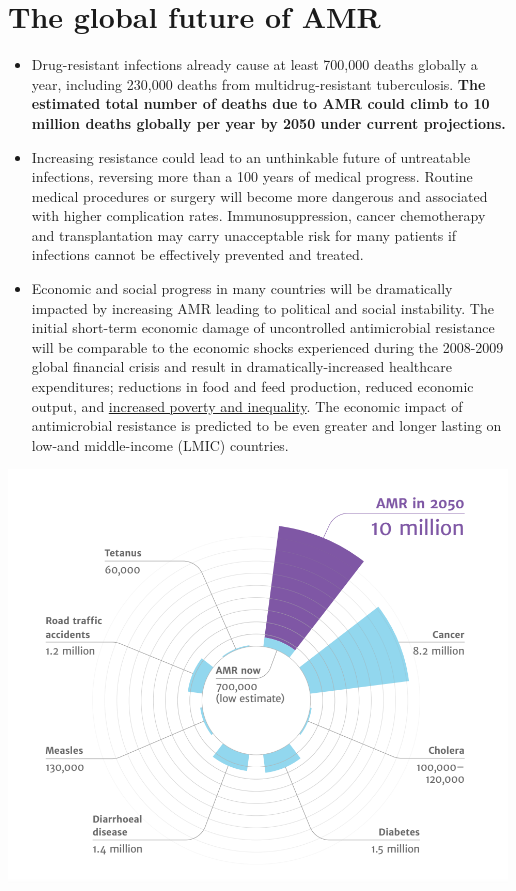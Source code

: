 \documentclass[
]{book}
\providecommand{\tightlist}{%
  \setlength{\itemsep}{0pt}\setlength{\parskip}{0pt}}
\begin{document}
\hypertarget{the-global-future-of-amr}{%
\section*{The global future of AMR}\label{the-global-future-of-amr}}

\begin{itemize}
\tightlist
\item
  Drug-resistant infections already cause at least 700,000 deaths globally a year, including 230,000 deaths from multidrug-resistant tuberculosis. \textbf{The estimated total number of deaths due to AMR could climb to 10 million deaths globally per year by 2050 under current projections.}
\item
  Increasing resistance could lead to an unthinkable future of untreatable infections, reversing more than a 100 years of medical progress. Routine medical procedures or surgery will become more dangerous and associated with higher complication rates. Immunosuppression, cancer chemotherapy and transplantation may carry unacceptable risk for many patients if infections cannot be effectively prevented and treated.
\item
  Economic and social progress in many countries will be dramatically impacted by increasing AMR leading to political and social instability. The initial short-term economic damage of uncontrolled antimicrobial resistance will be comparable to the economic shocks experienced during the 2008-2009 global financial crisis and result in dramatically-increased healthcare expenditures; reductions in food and feed production, reduced economic output, and \href{https://documents.worldbank.org/en/publication/documents-reports/documentdetail/323311493396993758/final-report}{increased poverty and inequality}. The economic impact of antimicrobial resistance is predicted to be even greater and longer lasting on low-and middle-income (LMIC) countries.
\end{itemize}

\includegraphics[width=5.20833in,height=\textheight]{images/AMR_deaths_2050.png}
\end{document}
